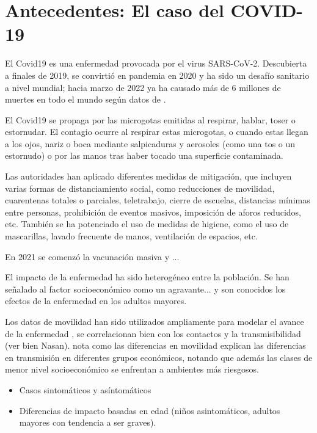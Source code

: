 \section{Antecedentes: El caso del COVID-19} \label{sec:antecedentes}

El Covid19 es una enfermedad provocada por el virus SARS-CoV-2. Descubierta a finales de 2019, se convirtió en pandemia en 2020 y ha sido un desafío sanitario a nivel mundial; hacia marzo de 2022 ya ha causado más de 6 millones de muertes en todo el mundo según datos de \cite{Mathieu2021}.

El Covid19 se propaga por las microgotas emitidas al respirar, hablar, toser o estornudar. El contagio ocurre al respirar estas microgotas, o cuando estas llegan a los ojos, nariz o boca mediante salpicaduras y aerosoles (como una tos o un estornudo) o por las manos tras haber tocado una superficie contaminada.

Las autoridades han aplicado diferentes medidas de mitigación, que incluyen varias formas de distanciamiento social, como reducciones de movilidad, cuarentenas totales o parciales, teletrabajo, cierre de escuelas, distancias mínimas entre personas, prohibición de eventos masivos, imposición de aforos reducidos, etc. También se ha potenciado el uso de medidas de higiene, como el uso de mascarillas, lavado frecuente de manos, ventilación de espacios, etc.

En 2021 se comenzó la vacunación masiva y ...

El impacto de la enfermedad ha sido heterogéneo entre la población. Se han señalado al factor socioeconómico \cite{Ahmed2020} como un agravante... y son conocidos los efectos de la enfermedad en los adultos mayores.

Los datos de movilidad han sido utilizados ampliamente para modelar el avance de la enfermedad \cite{Lai2020}\cite{Oliver2020}, se correlacionan bien con los contactos \cite{Prem2020} y la transmisibilidad \cite{Nasan2021} (ver bien Nasan). \cite{Chang2021} nota como las diferencias en movilidad explican las diferencias en transmisión en diferentes grupos económicos, notando que además las clases de menor nivel socioeconómico se enfrentan a ambientes más riesgosos.

\begin{itemize}

\item Casos sintomáticos y asíntomáticos 
\item Diferencias de impacto basadas en edad (niños asintomáticos, adultos mayores con tendencia a ser graves).

\end{itemize}


